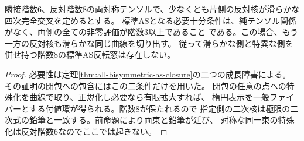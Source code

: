 \begin{corollary}[片側だけを用いた滑らかな楕円枝判定]\label{cor:one-smooth-apolar-as}
隣接階数6、反対階数8の両対称テンソルで、少なくとも片側の反対核が滑らかな四次完全交叉を定めるとする。
標準ASとなる必要十分条件は、純テンソル関係がなく、両側の全ての非零評価が階数3以上であること
である。この場合、もう一方の反対核も滑らかな同じ曲線を切り出す。
従って滑らかな側と特異な側を併せ持つ階数8の標準AS反転窓は存在しない。
\end{corollary}
\begin{proof}
必要性は定理\ref{thm:all-bisymmetric-as-closure}の二つの成長障害による。
その証明の閉包への包含にはこの二条件だけを用いた。
閉包の任意の点への特殊化を曲線で取り、正規化し必要なら有限拡大すれば、
楕円表示を一般ファイバーとする付値環が得られる。階数8が保たれるので
指定側の二次核は極限の二次式の鉛筆と一致する。前命題により両束と鉛筆が延び、
対称な同一束の特殊化は反対階数6なのでここでは起きない。
\end{proof}
